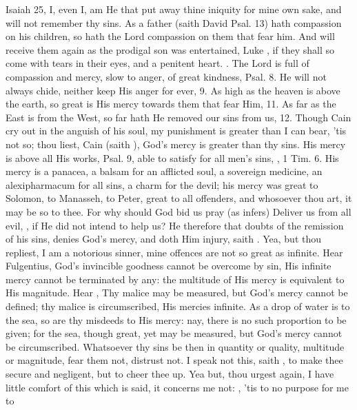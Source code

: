 {Isaiah  25, I, even I, am He that put away thine iniquity for
mine own sake, and will not remember thy sins. As a father (saith David
Psal.  13) hath compassion on his children, so hath the Lord
compassion on them that fear him. And will receive them again as the
prodigal son was entertained, Luke , if they shall so come with
tears in their eyes, and a penitent heart. . The Lord is full of compassion and mercy, slow to anger, of
great kindness, Psal.  8. He will not always chide, neither keep
His anger for ever, 9. As high as the heaven is above the earth, so
great is His mercy towards them that fear Him, 11. As far as the East
is from the West, so far hath He removed our sins from us, 12. Though
Cain cry out in the anguish of his soul, my punishment is greater than
I can bear, 'tis not so; thou liest, Cain (saith \Austin{}), God's mercy
is greater than thy sins. His mercy is above all His works, Psal. 
9, able to satisfy for all men's sins, , 1 Tim.  6. His
mercy is a panacea, a balsam for an afflicted soul, a sovereign
medicine, an alexipharmacum for all sins, a charm for the devil; his
mercy was great to Solomon, to Manasseh, to Peter, great to all
offenders, and whosoever thou art, it may be so to thee. For why should
God bid us pray (as \Austin{} infers) Deliver us from all evil, , if He did not intend to help us? He therefore
that doubts of the remission of his sins, denies God's mercy, and
doth Him injury, saith \Austin{}. Yea, but thou repliest, I am a notorious
sinner, mine offences are not so great as infinite. Hear Fulgentius,
God's invincible goodness cannot be overcome by sin, His infinite
mercy cannot be terminated by any: the multitude of His mercy is
equivalent to His magnitude. Hear \Chrysostom{}, Thy malice may be
measured, but God's mercy cannot be defined; thy malice is
circumscribed, His mercies infinite. As a drop of water is to the sea,
so are thy misdeeds to His mercy: nay, there is no such proportion to
be given; for the sea, though great, yet may be measured, but God's
mercy cannot be circumscribed. Whatsoever thy sins be then in quantity
or quality, multitude or magnitude, fear them not, distrust not. I
speak not this, saith \Chrysostom{}, to make thee secure and
negligent, but to cheer thee up. Yea but, thou urgest again, I have
little comfort of this which is said, it concerns me not: , 'tis to no purpose for me to
}
